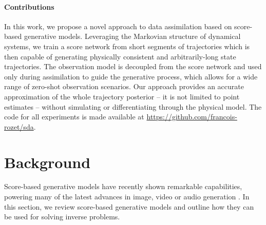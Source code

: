 \paragraph{Contributions}
In this work, we propose a novel approach to data assimilation based on score-based generative models. Leveraging the Markovian structure of dynamical systems, we train a score network from short segments of trajectories which is then capable of generating physically consistent and arbitrarily-long state trajectories. The observation model is decoupled from the score network and used only during assimilation to guide the generative process, which allows for a wide range of zero-shot observation scenarios. Our approach provides an accurate approximation of the whole trajectory posterior -- it is not limited to point estimates -- without simulating or differentiating through the physical model. The code for all experiments is made available at \url{https://github.com/francois-rozet/sda}.

\section{Background}

Score-based generative models have recently shown remarkable capabilities, powering many of the latest advances in image, video or audio generation \cite{rombach2022highresolution, ramesh2022hierarchical, saharia2022photorealistic, ho2022video, ho2022cascaded, ho2022imagen, kong2021diffwave, goel2022its}. In this section, we review score-based generative models and outline how they can be used for solving inverse problems.

